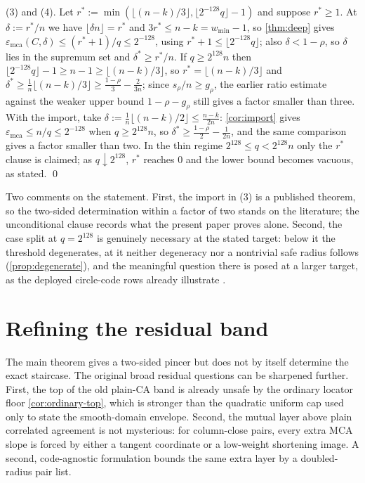 \documentclass[11pt]{amsart}
\theoremstyle{definition}
\theoremstyle{remark}
\newcommand{\emca}{\varepsilon_{\mathrm{mca}}}
\begin{document}
(3) and (4). Let $r^*:=\min(\lfloor(n-k)/3\rfloor,\lfloor2^{-128}q\rfloor-1)$ and suppose $r^*\ge1$. At $\delta:=r^*/n$ we have $\lfloor\delta n\rfloor=r^*$ and $3r^*\le n-k=w_{\min}-1$, so \cref{thm:deep} gives $\emca(C,\delta)\le(r^*+1)/q\le2^{-128}$, using $r^*+1\le\lfloor2^{-128}q\rfloor$; also $\delta<1-\rho$, so $\delta$ lies in the supremum set and $\delta^*\ge r^*/n$. If $q\ge2^{128}n$ then $\lfloor2^{-128}q\rfloor-1\ge n-1\ge\lfloor(n-k)/3\rfloor$, so $r^*=\lfloor(n-k)/3\rfloor$ and $\delta^*\ge\frac1n\lfloor(n-k)/3\rfloor\ge\frac{1-\rho}3-\frac2{3n}$; since $s_\rho/n\ge g_\rho$, the earlier ratio estimate against the weaker upper bound $1-\rho-g_\rho$ still gives a factor smaller than three. With the import, take $\delta:=\frac1n\lfloor(n-k)/2\rfloor\le\frac{n-k}{2n}$: \cref{cor:import} gives $\emca\le n/q\le2^{-128}$ when $q\ge2^{128}n$, so $\delta^*\ge\frac{1-\rho}2-\frac1{2n}$, and the same comparison gives a factor smaller than two. In the thin regime $2^{128}\le q<2^{128}n$ only the $r^*$ clause is claimed; as $q\downarrow2^{128}$, $r^*$ reaches $0$ and the lower bound becomes vacuous, as stated. \qed

\medskip
Two comments on the statement. First, the import in (3) is a published theorem, so the two-sided determination within a factor of two stands on the literature; the unconditional clause records what the present paper proves alone. Second, the case split at $q=2^{128}$ is genuinely necessary at the stated target: below it the threshold degenerates, at it neither degeneracy nor a nontrivial safe radius follows (\cref{prop:degenerate}), and the meaningful question there is posed at a larger target, as the deployed circle-code rows already illustrate \cite{Cho26b}.


\section{Refining the residual band}\label{sec:residual-band}

The main theorem gives a two-sided pincer but does not by itself determine the
exact staircase.  The original broad residual questions can be sharpened further.
First, the top of the old plain-CA band is already unsafe by the ordinary
locator floor \cref{cor:ordinary-top}, which is stronger than the quadratic
uniform cap used only to state the smooth-domain envelope.  Second, the mutual
layer above plain correlated agreement is not mysterious: for column-close
pairs, every extra MCA slope is forced by either a tangent coordinate or a
low-weight shortening image.  A second, code-agnostic formulation bounds the same
extra layer by a doubled-radius pair list.
\end{document}
